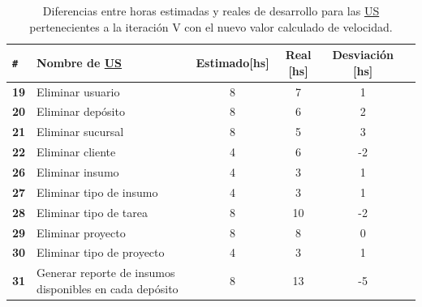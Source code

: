 \documentclass[a4paper, 12pt,twoside]{report}  %
\numberwithin{equation}{subsection} %
\begin{document}
\begin{table}[h!]
	\centering
	\captionsetup{justification=centering,margin=1.5cm}
	\begin{tabular}{ |p{0.5cm}|l|c|c|c|c| }
		\hline
		\verb|#|& \textbf{Nombre de \hyperlink{US}{US}}& \textbf{Estimado[hs]} & \textbf{Real [hs]} & \textbf{Desviación [hs]} \\
		\hline
		\textbf{19} & Eliminar usuario & 8 & 7 & \cellcolor{diferencia_estimacion_positiva}1 \\
		\hline
		\textbf{20} & Eliminar depósito & 8 & 6 & \cellcolor{diferencia_estimacion_positiva}2 \\
		\hline
		\textbf{21} & Eliminar sucursal & 8 & 5 & \cellcolor{diferencia_estimacion_positiva}3 \\
		\hline
		\textbf{22} & Eliminar cliente & 4 & 6 & \cellcolor{diferencia_estimacion_negativa}-2 \\
		\hline
		\textbf{26} & Eliminar insumo & 4 & 3 & \cellcolor{diferencia_estimacion_positiva}1 \\
		\hline
		\textbf{27} & Eliminar tipo de insumo & 4 & 3 & \cellcolor{diferencia_estimacion_positiva}1 \\
		\hline
		\textbf{28} & Eliminar tipo de tarea & 8 & 10 & \cellcolor{diferencia_estimacion_negativa}-2 \\
		\hline
		\textbf{29} & Eliminar proyecto & 8 & 8 & \cellcolor{diferencia_estimacion_positiva}0 \\
		\hline
		\textbf{30} & Eliminar tipo de proyecto & 4 & 3 & \cellcolor{diferencia_estimacion_positiva}1 \\
		\hline
		\textbf{31} & \parbox[c]{6cm}{\vspace{2pt} Generar reporte de insumos disponibles en cada depósito \vspace{2pt}} & 8 & 13 & -5 \\
		\hline
	\end{tabular}
	\caption{Diferencias entre horas estimadas y reales de desarrollo para las \protect\hyperlink{US}{US} pertenecientes a la iteración V con el nuevo valor calculado de velocidad.}
	\label{tabla_dif_horas_estim_iter_5}
\end{table}
\end{document}
